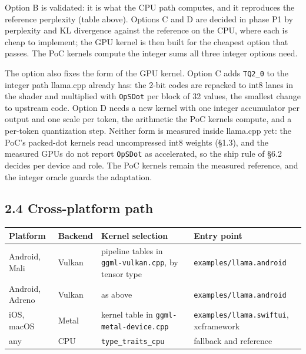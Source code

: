 \documentclass[
  10pt,
]{article}
\makeatletter
\newcounter{none} %
\newcommand{\needlines}[1]{\par\penalty-100\begingroup%
  \setlength{\dimen@}{#1\baselineskip}%
  \setlength{\dimen@ii}{\dimexpr\pagegoal-\pagetotal\relax}%
  \ifdim\dimen@>\dimen@ii\ifdim\dimen@ii>\z@\vfil\fi\break\fi%
  \endgroup}
\makeatother
\begin{document}
Option B is validated: it is what the CPU path computes, and it
reproduces the reference perplexity (table above). Options C and D are
decided in phase P1 by perplexity and KL divergence against the
reference on the CPU, where each is cheap to implement; the GPU kernel
is then built for the cheapest option that passes. The PoC kernels
compute the integer sums all three integer options need.

The option also fixes the form of the GPU kernel. Option C adds
\texttt{TQ2\_0} to the integer path llama.cpp already has: the 2-bit
codes are repacked to int8 lanes in the shader and multiplied with
\texttt{OpSDot} per block of 32 values, the smallest change to upstream
code. Option D needs a new kernel with one integer accumulator per
output and one scale per token, the arithmetic the PoC kernels compute,
and a per-token quantization step. Neither form is measured inside
llama.cpp yet: the PoC's packed-dot kernels read uncompressed int8
weights (\S{}1.3), and the measured GPUs do not report \texttt{OpSDot}
as accelerated, so the ship rule of \S{}6.2 decides per device and role.
The PoC kernels remain the measured reference, and the integer oracle
guards the adaptation.

\needlines{8}
\subsection{2.4 Cross-platform path}\label{cross-platform-path}

{\def\LTcaptype{none} %
\begin{longtable}[]{@{}
  >{\raggedright\arraybackslash}p{}
  >{\raggedright\arraybackslash}p{}
  >{\raggedright\arraybackslash}p{}
  >{\raggedright\arraybackslash}p{}@{}}
\toprule\noalign{}
\begin{minipage}[b]{\linewidth}\raggedright%
Platform
\end{minipage} & \begin{minipage}[b]{\linewidth}\raggedright%
Backend
\end{minipage} & \begin{minipage}[b]{\linewidth}\raggedright%
Kernel selection
\end{minipage} & \begin{minipage}[b]{\linewidth}\raggedright%
Entry point
\end{minipage} \\
\midrule\noalign{}
\endhead%
\bottomrule\noalign{}
\endlastfoot%
Android, Mali & Vulkan & pipeline tables in \texttt{ggml-vulkan.cpp}, by
tensor type & \texttt{examples/llama.android} \\
Android, Adreno & Vulkan & as above & \texttt{examples/llama.android} \\
iOS, macOS & Metal & kernel table in \texttt{ggml-metal-device.cpp} &
\texttt{examples/llama.swiftui}, xcframework \\
any & CPU & \texttt{type\_traits\_cpu} & fallback and reference \\
\end{longtable}
}
\end{document}
